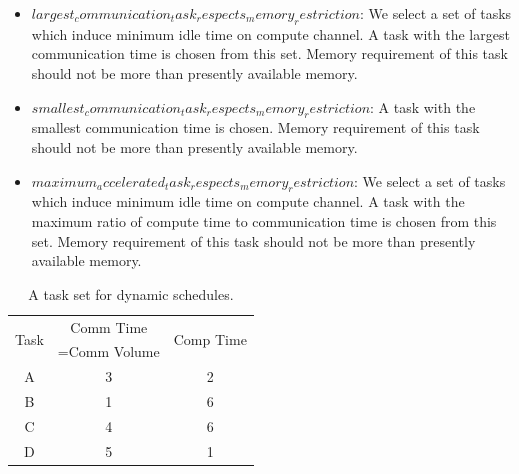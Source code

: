 \documentclass[runningheads]{llncs} %
\begin{document}
\begin{itemize}[a)]
	\item $largest_communication_task_respects_memory_restriction$:  We select a set of tasks which induce minimum idle time on compute channel. A task with the largest communication time is chosen from this set.  Memory requirement of this task should not be more than presently available memory. 
	\item $smallest_communication_task_respects_memory_restriction$: A task with the smallest communication time is chosen.  Memory requirement of this task should not be more than presently available memory. 
	\item $maximum_accelerated_task_respects_memory_restriction$:  We select a set of tasks which induce minimum idle time on compute channel. A task with the maximum ratio of compute time to communication time  is chosen from this set.  Memory requirement of this task should not  be more than presently available memory.
	
\end{itemize}
	\begin{table}[htb]
	\begin{center}
		
		\begin{tabular}{|c|c|c|}
			\hline
			\multirow{2}{*}{Task} & Comm Time & \multirow{2}{*}{Comp Time}\\ 
			&=Comm Volume& \\ \hline
			A & 3 & 2\\ \hline
			B & 1 & 6\\ \hline
			C & 4 & 6\\ \hline
			D & 5 & 1\\ \hline
		\end{tabular}
		\caption{\label{tab:dynamicSelectionExample} A task set for dynamic schedules.}
	\end{center}
\end{table}
\end{document}
